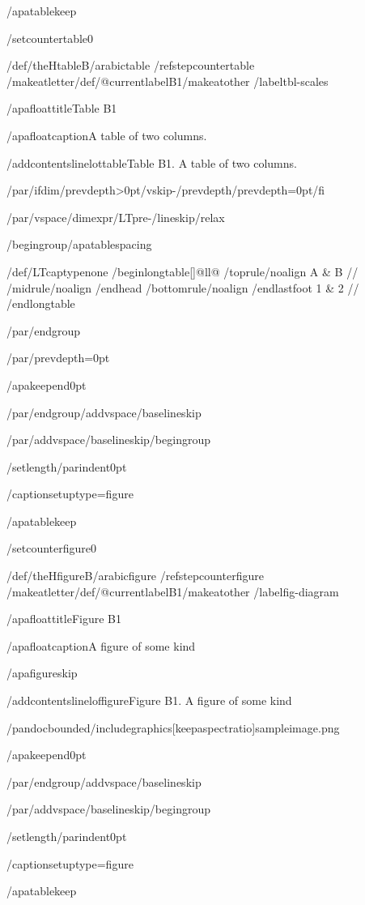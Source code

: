 /apatablekeep

/setcounter{table}{0}

/def/theHtable{B/arabic{table}}%
/refstepcounter{table}%
/makeatletter/def/@currentlabel{B1}/makeatother%
/label{tbl-scales}

/apafloattitle{Table B1}

/apafloatcaption{A table of two columns.}

/addcontentsline{lot}{table}{Table B1. A table of two columns.}

/par/ifdim/prevdepth>0pt/vskip-/prevdepth/prevdepth=0pt/fi

/par/vspace{/dimexpr/LTpre-/lineskip/relax}

/begingroup/apatablespacing

{/def/LTcaptype{none} %
/begin{longtable}[]{@{}ll@{}}
/toprule/noalign{}
A & B //
/midrule/noalign{}
/endhead
/bottomrule/noalign{}
/endlastfoot
1 & 2 //
/end{longtable}
}

/par/endgroup

/par/prevdepth=0pt

/apakeepend{0pt}

/par/endgroup/addvspace{/baselineskip}

/par/addvspace{/baselineskip}/begingroup

/setlength{/parindent}{0pt}

/captionsetup{type=figure}

/apatablekeep

/setcounter{figure}{0}

/def/theHfigure{B/arabic{figure}}%
/refstepcounter{figure}%
/makeatletter/def/@currentlabel{B1}/makeatother%
/label{fig-diagram}

/apafloattitle{Figure B1}

/apafloatcaption{A figure of some kind}

/apafigureskip

/addcontentsline{lof}{figure}{Figure B1. A figure of some kind}

/pandocbounded{/includegraphics[keepaspectratio]{sampleimage.png}}

/apakeepend{0pt}

/par/endgroup/addvspace{/baselineskip}

/par/addvspace{/baselineskip}/begingroup

/setlength{/parindent}{0pt}

/captionsetup{type=figure}

/apatablekeep

